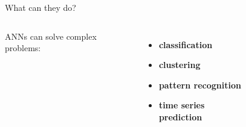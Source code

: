 \documentclass[11pt]{beamer}
\begin{document}
\begin{frame}{What can they do?}
	\begin{columns}
			ANNs can solve complex problems:
			\begin{itemize}
				\item \alert<2>{\textbf<2>{classification}}
				\item \alert<3>{\textbf<3>{clustering}}
				\item \alert<4>{\textbf<4>{pattern recognition}}
				\item \alert<5>{\textbf<5>{time series prediction}}
			\end{itemize}
			\begin{figure}
				\centering
			\end{figure}
	\end{columns}
\end{frame}
\end{document}
